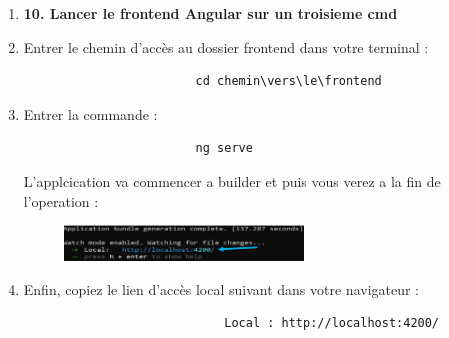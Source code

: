 \documentclass[12pt]{article}
\begin{document}
\begin{enumerate}
\begin{itemize}
                        \item Entrer le chemin d’accès au dossier backend dans votre terminal :
                            \begin{lstlisting}
                                cd C:\chemin\vers\backend\laravel
                            \end{lstlisting}
                        \item Faire la migration des tables de l'applications dans la base de données que vous avez créer a l'etape précédentes :
                            \begin{lstlisting}
                                php artisan migrate:refresh --seed
                            \end{lstlisting}
                        \item Lancer le serveur Laravel :
                            \begin{lstlisting}
                                php artisan serve
                            \end{lstlisting}
                    \end{itemize}
                \item \textbf{10. Lancer le frontend Angular sur un troisieme cmd}
                    \item Entrer le chemin d’accès au dossier frontend dans votre terminal :
                    \begin{lstlisting}
                        cd chemin\vers\le\frontend
                    \end{lstlisting}
                    \item Entrer la commande :
                    \begin{lstlisting}
                        ng serve
                    \end{lstlisting}
                    L'applcication va commencer a builder et puis vous verez a la fin de l'operation :
                    \begin{figure}[h] 
                        \centering 
                        \includegraphics[width=0.6\textwidth]{./img/angular.png} 
                    \end{figure}
                    \item Enfin, copiez le lien d'accès local suivant dans votre navigateur :
                        \begin{lstlisting}
                            Local : http://localhost:4200/
                        \end{lstlisting}
            \end{enumerate}
\end{document}
